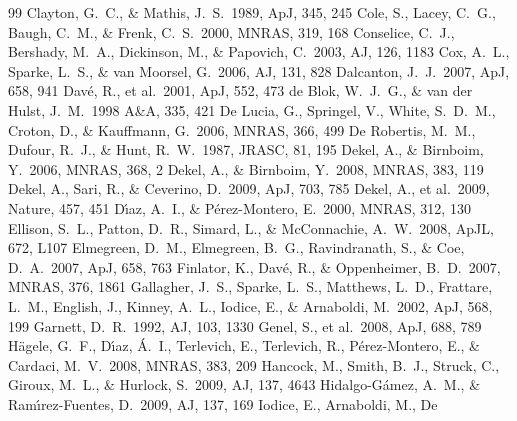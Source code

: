 \documentclass[12pt,preprint]{aastex}
\begin{document}
\begin{thebibliography}{99}
Clayton, G.~C., \& Mathis, J.~S.\ 1989, ApJ, 345, 245
 Cole, S., Lacey, C.~G.,
Baugh, C.~M., \& Frenk, C.~S.\ 2000, MNRAS, 319, 168
 Conselice, C.~J.,
Bershady, M.~A., Dickinson, M., \& Papovich, C.\ 2003, AJ, 126, 1183
 Cox, A.~L., Sparke, L.~S., \& van
  Moorsel, G.\ 2006, AJ, 131, 828
 Dalcanton, J.~J.\ 2007,
ApJ, 658, 941
 Dav{\'e}, R., et al.\ 2001,
  ApJ, 552, 473
 de Blok, W.~J.~G., \&
  van der Hulst, J.~M.\ 1998 A\&A, 335, 421
 De Lucia, G.,
Springel, V., White, S.~D.~M., Croton, D.,
\& Kauffmann, G.\ 2006, MNRAS, 366, 499
 De Robertis, M.~M.,
Dufour, R.~J., \& Hunt, R.~W.\ 1987, JRASC, 81, 195
 Dekel, A., \& Birnboim, Y.\ 2006, MNRAS, 368, 2
 Dekel, A., \& Birnboim, Y.\ 2008, MNRAS, 383, 119
 Dekel, A., Sari, R., \& Ceverino,
  D.\ 2009, ApJ, 703, 785
 Dekel, A., et al.\ 2009,
Nature, 457, 451
 D{\'{\i}}az, A.~I., \&
P{\'e}rez-Montero, E.\ 2000, MNRAS, 312, 130
 Ellison, S.~L., Patton,
D.~R., Simard, L., \& McConnachie, A.~W.\ 2008, ApJL, 672, L107
 Elmegreen, D.~M.,
Elmegreen, B.~G., Ravindranath, S., \& Coe, D.~A.\ 2007, ApJ, 658, 763
 Finlator, K.,
Dav{\'e}, R., \& Oppenheimer, B.~D.\ 2007, MNRAS, 376, 1861
 Gallagher, J.~S., Sparke,
  L.~S., Matthews, L.~D., Frattare, L.~M., English, J., Kinney, A.~L.,
  Iodice, E., \& Arnaboldi, M.\ 2002, ApJ, 568, 199
 Garnett, D.~R.\ 1992, AJ,
103, 1330
 Genel, S., et al.\ 2008,
ApJ, 688, 789
 H{\"a}gele, G.~F.,
D{\'{\i}}az, {\'A}.~I., Terlevich, E., Terlevich, R.,
P{\'e}rez-Montero, E., \& Cardaci, M.~V.\ 2008, MNRAS, 383, 209
 Hancock, M., Smith,
B.~J., Struck, C., Giroux, M.~L., \& Hurlock, S.\ 2009, AJ, 137, 4643
Hidalgo-G{\'a}mez, A.~M., \& Ram{\'{\i}}rez-Fuentes, D.\ 2009, AJ,
137, 169
 Iodice, E., Arnaboldi, M., De

\end{thebibliography}
\end{document}
